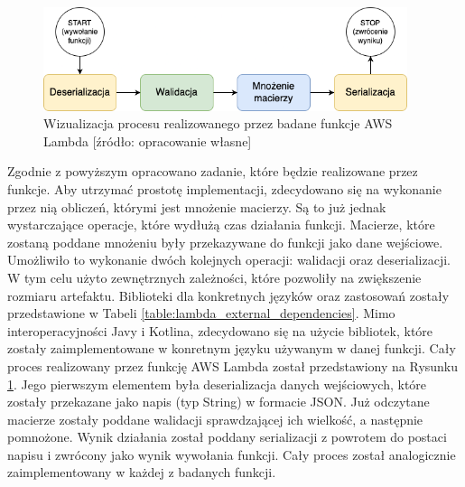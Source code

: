 \begin{figure}[h]
    \centering
    \includegraphics[width=0.95\textwidth]{charts/lambda_workflow.drawio.png}
    \caption{Wizualizacja procesu realizowanego przez badane funkcje AWS Lambda [źródło: opracowanie własne]}
    \label{fig:lambda_workflow}
\end{figure}

Zgodnie z powyższym opracowano zadanie, które będzie realizowane przez funkcje.
Aby utrzymać prostotę implementacji, zdecydowano się na wykonanie przez nią obliczeń, którymi jest mnożenie macierzy.
Są to już jednak wystarczające operacje, które wydłużą czas działania funkcji.
Macierze, które zostaną poddane mnożeniu były przekazywane do funkcji jako dane wejściowe.
Umożliwiło to wykonanie dwóch kolejnych operacji: walidacji oraz deserializacji.
W tym celu użyto zewnętrznych zależności, które pozwoliły na zwiększenie rozmiaru artefaktu.
Biblioteki dla konkretnych języków oraz zastosowań zostały przedstawione w Tabeli \ref{table:lambda_external_dependencies}.
Mimo interoperacyjności Javy i Kotlina, zdecydowano się na użycie bibliotek, które zostały zaimplementowane w konretnym języku używanym w danej funkcji.
Cały proces realizowany przez funkcję AWS Lambda został przedstawiony na Rysunku \ref{fig:lambda_workflow}.
Jego pierwszym elementem była deserializacja danych wejściowych, które zostały przekazane jako napis (typ String) w formacie JSON.
Już odczytane macierze zostały poddane walidacji sprawdzającej ich wielkość, a następnie pomnożone.
Wynik działania został poddany serializacji z powrotem do postaci napisu i zwrócony jako wynik wywołania funkcji.
Cały proces został analogicznie zaimplementowany w każdej z badanych funkcji.

